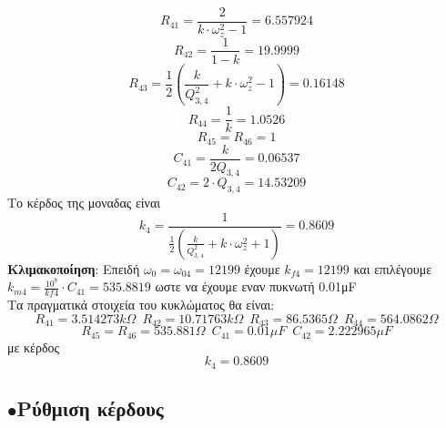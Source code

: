 \documentclass{article}
\begin{document}
{\begin{equation*}
R_{41} = \frac{2}{k \cdot ω_z^2 -1} = 6.557924
\end{equation*}
\begin{equation*}
R_{42} = \frac{1}{1-k} = 19.9999
\end{equation*}
\begin{equation*}
R_{43} =\frac{1}{2}( \frac{k}{Q_{3,4}^2} + k \cdot ω_z^2 -1) = 0.16148
\end{equation*}
\begin{equation*}
R_{44} =\frac{1}{k} = 1.0526
\end{equation*}
\begin{equation*}
R_{45}= R_{46} = 1
\end{equation*}
\begin{equation*}
C_{41} =\frac{k}{2Q_{3,4}} =  0.06537
\end{equation*}
\begin{equation*}
C_{42} =2 \cdot Q_{3,4} = 14.53209
\end{equation*}
Το κέρδος της μοναδας είναι 
\begin{equation*}
k_{4} = \frac{1}{\frac{1}{2}( \frac{k}{Q_{3,4}^2} + k \cdot ω_z^2 +1)} = 0.8609
\end{equation*}
\textbf{Κλιμακοποίηση}: Eπειδή $ω_0 = ω_{04} = 12199$ έχουμε $k_{f4} = 12199$ και επιλέγουμε $k_{m4} = \frac{10^8}{kf4} \cdot C_{41} =  535.8819$ ωστε να έχουμε εναν πυκνωτή 0.01μF 
\\Τα πραγματικά στοιχεία του κυκλώματος θα είναι:
\begin{equation*}
\boxed{R_{41}= 3.514273 kΩ} \enspace \boxed{R_{42}= 10.71763 kΩ} \enspace \boxed{R_{43}= 86.5365 Ω} 
\enspace \boxed{R_{44}= 564.0862 Ω} 
\end{equation*} 
\begin{equation*}
\boxed{R_{45}= R_{46} = 535.881 Ω} \enspace \boxed{C_{41}= 0.01 μF} \enspace \boxed{C_{42}= 2.222965 μF}
\end{equation*}
με κέρδος
\begin{equation*}
\boxed{k_4 = 0.8609}
\end{equation*}



\clearpage 

\subsection*{$\bullet$Ρύθμιση κέρδους}
 
 

}
\end{document}
